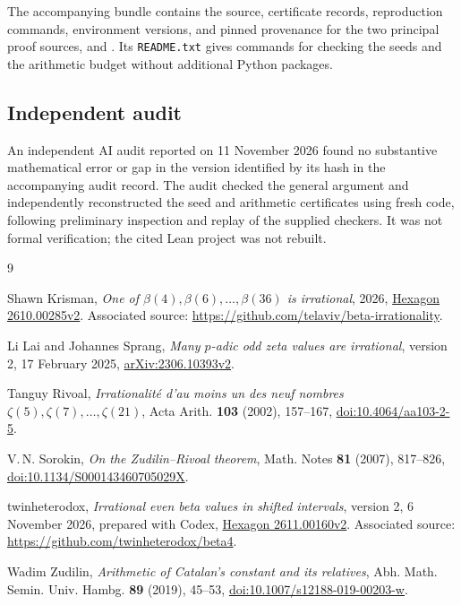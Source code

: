\documentclass[11pt]{article}
\begin{document}
The accompanying bundle contains the source, certificate records,
reproduction commands, environment versions, and pinned provenance for
the two principal proof sources, \cite{krisman} and \cite{shifted}.
Its \texttt{README.txt} gives commands for checking
the seeds and the arithmetic budget without additional Python packages.

\subsection{Independent audit}

An independent AI audit reported on 11 November 2026 found no substantive
mathematical error or gap in the version identified by its hash in the
accompanying audit record. The audit checked the general argument and
independently reconstructed the seed and arithmetic certificates using
fresh code, following preliminary inspection and replay of the supplied
checkers. It was not formal verification; the cited Lean project was not
rebuilt.

\begin{thebibliography}{9}
\raggedright
{}
Shawn Krisman, \emph{One of $\beta(4),\beta(6),\ldots,\beta(36)$ is irrational},
2026, \href{https://hexagonmath.org/pdf/2610.00285v2}{Hexagon 2610.00285v2}.
Associated source: \url{https://github.com/telaviv/beta-irrationality}.

Li Lai and Johannes Sprang, \emph{Many $p$-adic odd zeta values are irrational},
version 2, 17 February 2025,
\href{https://arxiv.org/abs/2306.10393v2}{arXiv:2306.10393v2}.

Tanguy Rivoal, \emph{Irrationalit\'e d'au moins un des neuf nombres
$\zeta(5),\zeta(7),\ldots,\zeta(21)$}, Acta Arith. \textbf{103} (2002),
157--167, \href{https://doi.org/10.4064/aa103-2-5}{doi:10.4064/aa103-2-5}.

V.\,N. Sorokin, \emph{On the Zudilin--Rivoal theorem},
Math. Notes \textbf{81} (2007), 817--826,
\href{https://doi.org/10.1134/S000143460705029X}{doi:10.1134/S000143460705029X}.

twinheterodox, \emph{Irrational even beta values in shifted intervals},
version 2, 6 November 2026, prepared with Codex,
\href{https://hexagonmath.org/pdf/2611.00160v2}{Hexagon 2611.00160v2}.
Associated source: \url{https://github.com/twinheterodox/beta4}.

Wadim Zudilin, \emph{Arithmetic of Catalan's constant and its relatives},
Abh. Math. Semin. Univ. Hambg. \textbf{89} (2019), 45--53,
\href{https://doi.org/10.1007/s12188-019-00203-w}{doi:10.1007/s12188-019-00203-w}.
\end{thebibliography}
\end{document}
